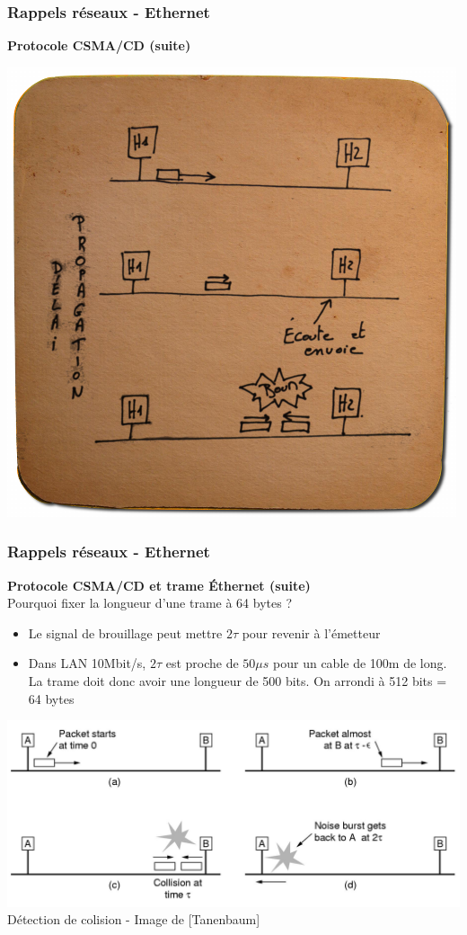 \begin{frame}[fragile]
  \frametitle{Rappels réseaux - Ethernet}
{\large\bf Protocole CSMA/CD (suite)}\\
\begin{center}
	\includegraphics[width=.6\linewidth]{img/sousbock-csmacd-propagation.png}
\end{center}
\end{frame}

\begin{frame}[fragile]
  \frametitle{Rappels réseaux - Ethernet}
{\large\bf Protocole CSMA/CD et trame Éthernet (suite)}\\
Pourquoi fixer la longueur d'une trame à 64 bytes ? 
\begin{itemize}
	\item Le signal de brouillage peut mettre $2\tau$ pour revenir à l'émetteur 
	\item Dans LAN 10Mbit/s, $2\tau$ est proche de $50\mu s$ pour un cable
	de 100m de long. La trame doit donc avoir une longueur de 500 bits. On
	arrondi à 512 bits = 64 bytes
\end{itemize}
\begin{center}
	\includegraphics[width=.80\linewidth]{img/4-22.jpg} \\
	{\scriptsize Détection de colision - Image de [Tanenbaum]}
\end{center}
\end{frame}

